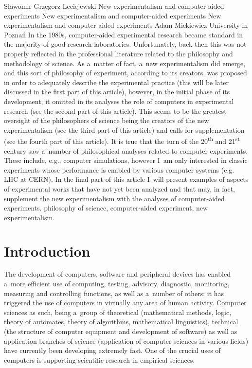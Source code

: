 \begin{artengenv}{Sławomir Grzegorz Leciejewski}
	{New experimentalism and computer-aided experiments}
	{New experimentalism and computer-aided experiments}
	{New experimentalism and computer-aided experiments}
	{Adam Mickiewicz University in Poznań}
	{In the 1980s, computer-aided experimental research became standard in the majority of good research laboratories. Unfortunately, back then this was not properly reflected in the professional literature related to the philosophy and methodology of science. As a~matter of fact, a~new experimentalism did emerge, and this sort of philosophy of experiment, according to its creators, was proposed in order to adequately describe the experimental practice (this will be later discussed in the first part of this article), however, in the initial phase of its development, it omitted in its analyses the role of computers in experimental research (see the second part of this article). This seems to be the greatest oversight of the philosophers of science being the creators of the new experimentalism (see the third part of this article) and calls for supplementation (see the fourth part of this article). It is true that the turn of the 20\textsuperscript{th} and 21\textsuperscript{st} century saw a~number of philosophical analyses related to computer experiments. These include, e.g., computer simulations, however I~am only interested in classic experiments whose performance is enabled by various computer systems (e.g. LHC at CERN). In the final part of this article I~will present examples of aspects of experimental works that have not yet been analyzed and that may, in fact, supplement the new experimentalism with the analyses of computer-aided experiments.
	}
	{philosophy of science, computer-aided experiment, new experimentalism.}





\section*{Introduction}

\lettrine[loversize=0.13,lines=2,lraise=-0.03,nindent=0em,findent=0.2pt]%
{T}{}he development of computers, software and peripheral devices has enabled a~more efficient use of computing, testing, advisory, diagnostic, monitoring, measuring and controlling functions, as well as a~number of others; it has triggered the use of computers in virtually any area of human activity. Computer sciences as such, being a~group of theoretical (mathematical methods, logic, theory of automates, theory of algorithms, mathematical linguistics), technical (the structure of computer equipment and development of software) as well as application branches of science (application of computer sciences in various fields) have currently been developing extremely fast. One of the crucial uses of computers is supporting scientific research in empirical sciences.


\end{artengenv}
